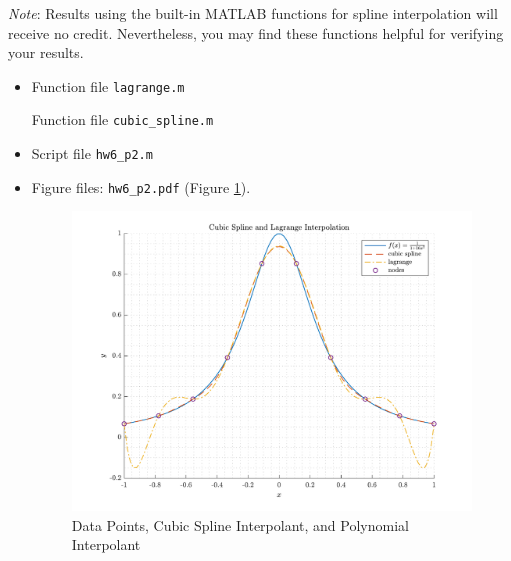 \emph{Note}: Results using the built-in MATLAB functions for spline interpolation will receive no credit. Nevertheless, you may find these functions helpful for verifying your results.
\begin{solution}
  \quad
  \begin{itemize}
    \item
      Function file \verb|lagrange.m|
      
      Function file \verb|cubic_spline.m|
      
    \item
      Script file \verb|hw6_p2.m|
      
      \newpage
    \item
      Figure files: \verb|hw6_p2.pdf| (Figure \ref{fig:p2}).
      \begin{figure}[!hbtp]
        \centering
        \includegraphics[width=0.75\linewidth]{../src/hw6_p2.pdf}
        \caption{Data Points, Cubic Spline Interpolant, and Polynomial Interpolant}%
        \label{fig:p2}
      \end{figure}
  \end{itemize}
\end{solution}

